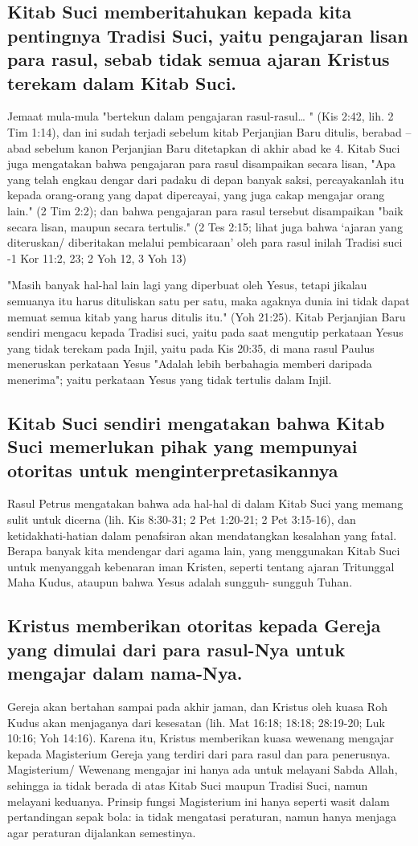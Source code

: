 \subsection{Kitab Suci memberitahukan kepada kita pentingnya Tradisi Suci, yaitu pengajaran lisan para rasul, sebab tidak semua ajaran Kristus terekam dalam Kitab Suci.}
Jemaat mula-mula "bertekun dalam pengajaran rasul-rasul… " (Kis 2:42, lih. 2 Tim 1:14), dan ini sudah terjadi sebelum kitab Perjanjian Baru ditulis, berabad – abad sebelum kanon Perjanjian Baru ditetapkan di akhir abad ke 4. Kitab Suci juga mengatakan bahwa pengajaran para rasul disampaikan secara lisan, "Apa yang telah engkau dengar dari padaku di depan banyak saksi, percayakanlah itu kepada orang-orang yang dapat dipercayai, yang juga cakap mengajar orang lain." (2 Tim 2:2); dan bahwa pengajaran para rasul tersebut disampaikan "baik secara lisan, maupun secara tertulis." (2 Tes 2:15; lihat juga bahwa ‘ajaran yang diteruskan/ diberitakan melalui pembicaraan’ oleh para rasul inilah Tradisi suci -1 Kor 11:2, 23; 2 Yoh 12, 3 Yoh 13)

"Masih banyak hal-hal lain lagi yang diperbuat oleh Yesus, tetapi jikalau semuanya itu harus dituliskan satu per satu, maka agaknya dunia ini tidak dapat memuat semua kitab yang harus ditulis itu." (Yoh 21:25). Kitab Perjanjian Baru sendiri mengacu kepada Tradisi suci, yaitu pada saat mengutip perkataan Yesus yang tidak terekam pada Injil, yaitu pada Kis 20:35, di mana rasul Paulus meneruskan perkataan Yesus "Adalah lebih berbahagia memberi daripada menerima"; yaitu perkataan Yesus yang tidak tertulis dalam Injil.

\subsection{Kitab Suci sendiri mengatakan bahwa Kitab Suci memerlukan pihak yang mempunyai otoritas untuk menginterpretasikannya}
Rasul Petrus mengatakan bahwa ada hal-hal di dalam Kitab Suci yang memang sulit untuk dicerna (lih. Kis 8:30-31; 2 Pet 1:20-21; 2 Pet 3:15-16), dan ketidakhati-hatian dalam penafsiran akan mendatangkan kesalahan yang fatal. Berapa banyak kita mendengar dari agama lain, yang menggunakan Kitab Suci untuk menyanggah kebenaran iman Kristen, seperti tentang ajaran Tritunggal Maha Kudus, ataupun bahwa Yesus adalah sungguh- sungguh Tuhan.

\subsection{Kristus memberikan otoritas kepada Gereja yang dimulai dari para rasul-Nya untuk mengajar dalam nama-Nya.}
Gereja akan bertahan sampai pada akhir jaman, dan Kristus oleh kuasa Roh Kudus akan menjaganya dari kesesatan (lih. Mat 16:18; 18:18; 28:19-20; Luk 10:16; Yoh 14:16). Karena itu, Kristus memberikan kuasa wewenang mengajar kepada Magisterium Gereja yang terdiri dari para rasul dan para penerusnya. Magisterium/ Wewenang mengajar ini hanya ada untuk melayani Sabda Allah, sehingga ia tidak berada di atas Kitab Suci maupun Tradisi Suci, namun melayani keduanya. Prinsip fungsi Magisterium ini hanya seperti wasit dalam pertandingan sepak bola: ia tidak mengatasi peraturan, namun hanya menjaga agar peraturan dijalankan semestinya.

